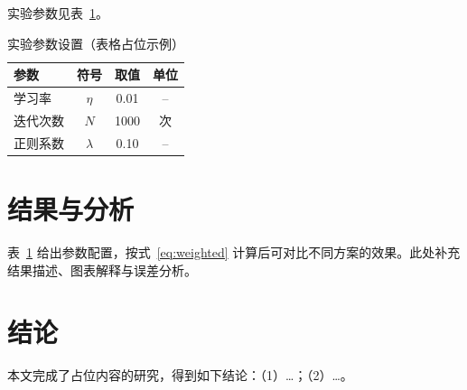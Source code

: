\documentclass[UTF8,a4paper,zihao=-4,fontset=\swfontset]{ctexart}
\begin{document}
实验参数见表~\ref{tab:params}。

\begin{table}[htbp]
  \centering
  \caption{实验参数设置（表格占位示例）}
  \label{tab:params}
  \begin{tabular}{lccc}
    \toprule
    参数 & 符号 & 取值 & 单位 \\
    \midrule
    学习率     & $\eta$   & 0.01 & --   \\
    迭代次数   & $N$      & 1000 & 次   \\
    正则系数   & $\lambda$& 0.10 & --   \\
    \bottomrule
  \end{tabular}
\end{table}

\section{结果与分析}

表~\ref{tab:params} 给出参数配置，按式~\eqref{eq:weighted} 计算后可对比不同方案的效果。此处补充结果描述、图表解释与误差分析。

\section{结论}

本文完成了占位内容的研究，得到如下结论：（1）\ldots；（2）\ldots。



\end{document}
